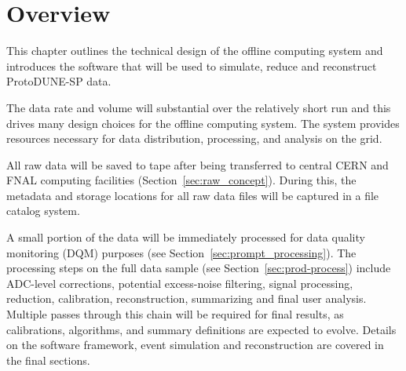\section{Overview}

This chapter outlines the technical design of the offline computing
system and introduces the software that will be used to simulate,
reduce and reconstruct ProtoDUNE-SP data.

The data rate and volume will substantial over the relatively short
run and this drives many design choices for the offline computing
system.  The system provides resources necessary for data
distribution, processing, and analysis on the
grid\cite{data_managm_sys}.

All raw data will be saved to tape after being transferred to central
CERN and FNAL computing facilities (Section~\ref{sec:raw_concept}).
During this, the metadata and storage locations for all raw data files
will be captured in a file catalog system.

A small portion of the data will be immediately processed for  
data quality monitoring (DQM) purposes (see Section~\ref{sec:prompt_processing}).
%
The processing steps on the full data sample (see
Section~\ref{sec:prod-process}) include ADC-level corrections,
potential excess-noise filtering, signal processing, reduction,
calibration, reconstruction, summarizing and final user analysis.
Multiple passes through this chain will be required for final results,
as calibrations, algorithms, and summary definitions are expected to
evolve.  Details on the software framework, event simulation and
reconstruction are covered in the final sections.

